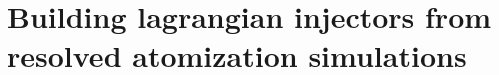 \documentclass[twoside]{report}
\begin{document}
\part{Building lagrangian injectors from resolved atomization simulations}

\newpage 

\newpage
%
%
%
%
%
%
%
%
%
%
%

\fancyhead[LO]{}
\nocite{*}




%
%
%
%
\end{document}
